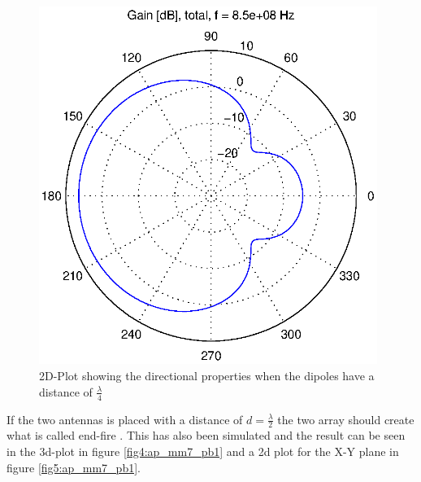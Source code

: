 \begin{figure}[!h]
  \centering
  \includegraphics[width=11cm]{figures/two_dipoles_lambda_4_xyplot.eps}
  \caption{2D-Plot showing the directional properties when the dipoles have a distance of $\frac{\lambda}{4}$}
  \label{fig3:ap_mm7_pb1}
\end{figure}

If the two antennas is placed with a distance of $d=\frac{\lambda}{2}$ the two array should create what is called end-fire \citep[Sec. 6.3.2]{lit:AT}. This has also been simulated and the result can be seen in the 3d-plot in figure \ref{fig4:ap_mm7_pb1} and a 2d plot for the X-Y plane in figure \ref{fig5:ap_mm7_pb1}.

